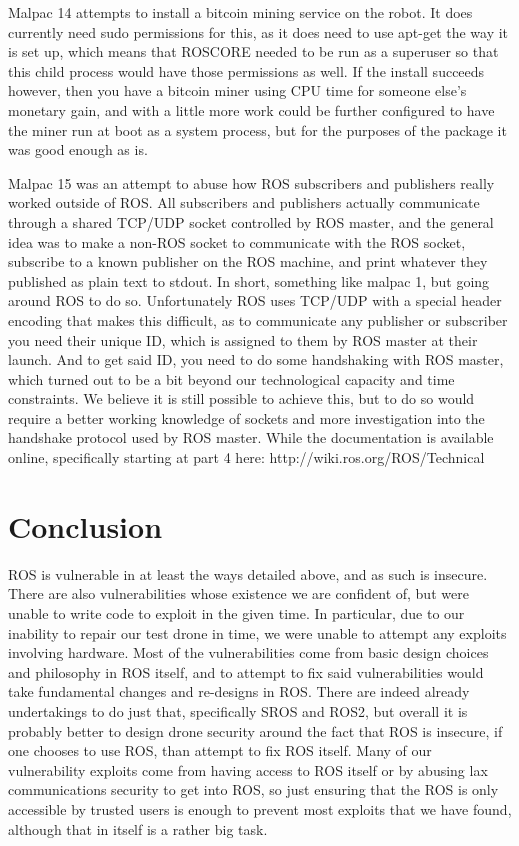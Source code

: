 \documentclass[IEEEtran,letterpaper,10pt,notitlepage,draftclsnofoot,onecolumn]{article}
\begin{document}
Malpac 14 attempts to install a bitcoin mining service on the robot. 
It does currently need sudo permissions for this, as it does need to use apt-get the way it is set up, which means that ROSCORE needed to be run as a superuser so that this child process would have those permissions as well. 
If the install succeeds however, then you have a bitcoin miner using CPU time for someone else’s monetary gain, and with a little more work could be further configured to have the miner run at boot as a system process, but for the purposes of the package it was good enough as is. 

Malpac 15 was an attempt to abuse how ROS subscribers and publishers really worked outside of ROS. 
All subscribers and publishers actually communicate through a shared TCP/UDP socket controlled by ROS master, and the general idea was to make a non-ROS socket to communicate with the ROS socket, subscribe to a known publisher on the ROS machine, and print whatever they published as plain text to stdout. 
In short, something like malpac 1, but going around ROS to do so. Unfortunately ROS uses TCP/UDP with a special header encoding that makes this difficult, as to communicate any publisher or subscriber you need their unique ID, which is assigned to them by ROS master at their launch. 
And to get said ID, you need to do some handshaking with ROS master, which turned out to be a bit beyond our technological capacity and time constraints. 
We believe it is still possible to achieve this, but to do so would require a better working knowledge of sockets and more investigation into the handshake protocol used by ROS master. 
While the documentation is available online, specifically starting at part 4 here: http://wiki.ros.org/ROS/Technical%

\section{Conclusion}
ROS is vulnerable in at least the ways detailed above, and as such is insecure. 
There are also vulnerabilities whose existence we are confident of, but were unable to write code to exploit in the given time. 
In particular, due to our inability to repair our test drone in time, we were unable to attempt any exploits involving hardware. 
Most of the vulnerabilities come from basic design choices and philosophy in ROS itself, and to attempt to fix said vulnerabilities would take fundamental changes and re-designs in ROS. 
There are indeed already undertakings to do just that, specifically SROS and ROS2, but overall it is probably better to design drone security around the fact that ROS is insecure, if one chooses to use ROS, than attempt to fix ROS itself. 
Many of our vulnerability exploits come from having access to ROS itself or by abusing lax communications security to get into ROS, so just ensuring that the ROS is only accessible by trusted users is enough to prevent most exploits that we have found, although that in itself is a rather big task.
\end{document}
